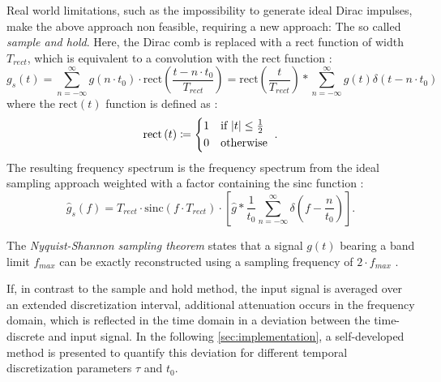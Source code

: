 Real world limitations, such as the impossibility to generate ideal Dirac impulses, make the above approach non feasible, requiring a new approach: The so called \emph{sample and hold}. Here, the Dirac comb is replaced with a rect function of width $T_{rect}$, which is equivalent to a convolution with the rect function \cite{engelberg2008,ceschi2017}:
\begin{equation} \label{eq:sample-and-hold-time}
	g_s\left(t\right) = \sum_{n = -\infty}^{\infty} g\left(n \cdot t_0\right) \cdot \text{rect}\left(\frac{t - n \cdot t_0}{T_{rect}}\right) = \text{rect}\left(\frac{t}{T_{rect}}\right) * \sum_{n = -\infty}^{\infty} g\left(t\right)\delta\left(t - n \cdot t_0\right)
\end{equation}
where the $\text{rect}\left(t\right)$ function is defined as \cite{engelberg2008,ceschi2017}:
\begin{equation}
\text{rect}\left(t\right) \coloneqq
\begin{cases*}
1 & if $\abs{t} \leq \frac{1}{2}$ \\
0 & otherwise
\end{cases*}.
\end{equation}
The resulting frequency spectrum is the frequency spectrum from the ideal sampling approach weighted with a factor containing the sinc function \cite{engelberg2008,ceschi2017}:
\begin{equation} \label{eq:sample-and-hold-frequency}
	\hat{g}_s\left(f\right) = T_{rect} \cdot \text{sinc}\left(f \cdot T_{rect}\right) \cdot \left[\hat{g} * \frac{1}{t_0}\sum_{n = -\infty}^{\infty}\delta\left(f - \frac{n}{t_0}\right)\right].
\end{equation}

The \emph{Nyquist-Shannon sampling theorem} states that a signal $g\left(t\right)$ bearing a band limit $f_{max}$ can be exactly reconstructed using a sampling frequency of $2 \cdot f_{max}$ \cite{Shannon1949}. 

If, in contrast to the sample and hold method, the input signal is averaged over an extended discretization interval, additional attenuation occurs in the frequency domain, which is reflected in the time domain in a deviation between the time-discrete and input signal. In the following \cref{sec:implementation}, a self-developed method is presented to quantify this deviation for different temporal discretization parameters $\tau$ and $t_0$.
